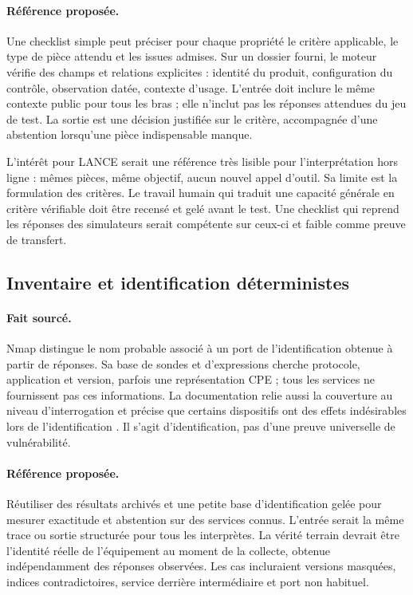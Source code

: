 \documentclass[11pt,a4paper]{article}
\begin{document}
\paragraph{Référence proposée.}
Une checklist simple peut préciser pour chaque propriété le critère applicable, le type de pièce attendu et les issues admises. Sur un dossier fourni, le moteur vérifie des champs et relations explicites : identité du produit, configuration du contrôle, observation datée, contexte d'usage. L'entrée doit inclure le même contexte public pour tous les bras ; elle n'inclut pas les réponses attendues du jeu de test. La sortie est une décision justifiée sur le critère, accompagnée d'une abstention lorsqu'une pièce indispensable manque.

L'intérêt pour LANCE serait une référence très lisible pour l'interprétation hors ligne : mêmes pièces, même objectif, aucun nouvel appel d'outil. Sa limite est la formulation des critères. Le travail humain qui traduit une capacité générale en critère vérifiable doit être recensé et gelé avant le test. Une checklist qui reprend les réponses des simulateurs serait compétente sur ceux-ci et faible comme preuve de transfert.

\subsection{Inventaire et identification déterministes}
\paragraph{Fait sourcé.}
Nmap distingue le nom probable associé à un port de l'identification obtenue à partir de réponses. Sa base de sondes et d'expressions cherche protocole, application et version, parfois une représentation CPE ; tous les services ne fournissent pas ces informations. La documentation relie aussi la couverture au niveau d'interrogation et précise que certains dispositifs ont des effets indésirables lors de l'identification \cite{nmap}. Il s'agit d'identification, pas d'une preuve universelle de vulnérabilité.

\paragraph{Référence proposée.}
Réutiliser des résultats archivés et une petite base d'identification gelée pour mesurer exactitude et abstention sur des services connus. L'entrée serait la même trace ou sortie structurée pour tous les interprètes. La vérité terrain devrait être l'identité réelle de l'équipement au moment de la collecte, obtenue indépendamment des réponses observées. Les cas incluraient versions masquées, indices contradictoires, service derrière intermédiaire et port non habituel.
\end{document}

